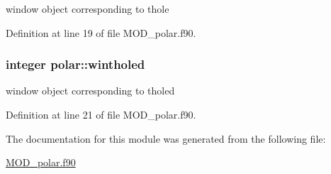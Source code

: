 window object corresponding to thole 



Definition at line 19 of file M\-O\-D\-\_\-polar.\-f90.

\hypertarget{classpolar_af5af16a26a1e990d4e28a1ce5c491178}{
\subsubsection[{wintholed}]{\setlength{\rightskip}{0pt plus 5cm}integer polar\-::wintholed}}\label{classpolar_af5af16a26a1e990d4e28a1ce5c491178}


window object corresponding to tholed 



Definition at line 21 of file M\-O\-D\-\_\-polar.\-f90.



The documentation for this module was generated from the following file\-:\begin{DoxyCompactItemize}
\item 
\hyperlink{MOD__polar_8f90}{M\-O\-D\-\_\-polar.\-f90}\end{DoxyCompactItemize}

